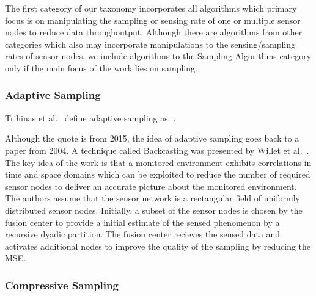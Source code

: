 The first category of our taxonomy incorporates all algorithms which primary 
focus is on manipulating the sampling or sensing rate of one or multiple sensor
nodes to reduce data throughoutput. 
Although there are algorithms from other categories which also may incorporate
manipulations to the sensing/sampling rates of sensor nodes, we include
algorithms to the Sampling Algorithms category only if the main focus of the
work lies on sampling. 


\subsubsection{Adaptive Sampling}
\label{sec:Adaptive Sampling}

Trihinas et al.~\cite{trihinas2015adam} define adaptive sampling as:
.
\par
Although the quote is from 2015, the idea of adaptive sampling goes back to a
paper from 2004. A technique called Backcasting was presented by Willet et
al.~\cite{willett2004backcasting}. The key idea of the work is that a monitored
environment exhibits correlations in time and space domains which can be
exploited to reduce the number of required sensor nodes to deliver an accurate
picture about the monitored environment. The authors assume that the sensor
network is a rectangular field of uniformly distributed sensor nodes.
Initially, a subset of the sensor nodes is chosen by the fusion center to
provide a initial estimate of the sensed phenomenon by a recursive dyadic 
partition.
The fusion center recieves the sensed data and activates additional nodes to
improve the quality of the sampling by reducing the \ac{MSE}.


\subsubsection{Compressive Sampling}
\label{sec:Compressive Sampling}


\subsection{\catII}
\label{sec:\catII}

